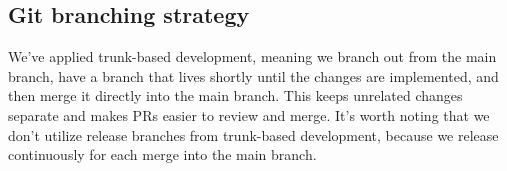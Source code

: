 \subsection{Git branching strategy}
We've applied trunk-based development, meaning we branch out from the main branch, have a branch that lives shortly until the changes are implemented, and then merge it directly into the main branch. This keeps unrelated changes separate and makes PRs easier to review and merge. It's worth noting that we don't utilize release branches from trunk-based development, because we release continuously for each merge into the main branch.
